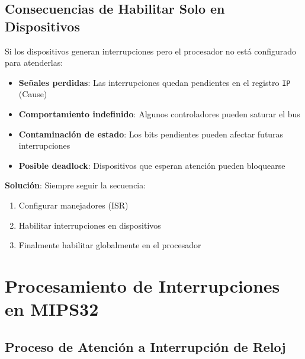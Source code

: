 \documentclass{article}
\begin{document}
\subsection{Consecuencias de Habilitar Solo en Dispositivos}

Si los dispositivos generan interrupciones pero el procesador no está configurado para atenderlas:

\begin{itemize}
\item \textbf{Señales perdidas}: Las interrupciones quedan pendientes en el registro \texttt{IP} (Cause)
\item \textbf{Comportamiento indefinido}: Algunos controladores pueden saturar el bus
\item \textbf{Contaminación de estado}: Los bits pendientes pueden afectar futuras interrupciones
\item \textbf{Posible deadlock}: Dispositivos que esperan atención pueden bloquearse
\end{itemize}

\textbf{Solución}: Siempre seguir la secuencia:
\begin{enumerate}
\item Configurar manejadores (ISR)
\item Habilitar interrupciones en dispositivos
\item Finalmente habilitar globalmente en el procesador
\end{enumerate}
\section{Procesamiento de Interrupciones en MIPS32}
\subsection{Proceso de Atención a Interrupción de Reloj}
\end{document}
